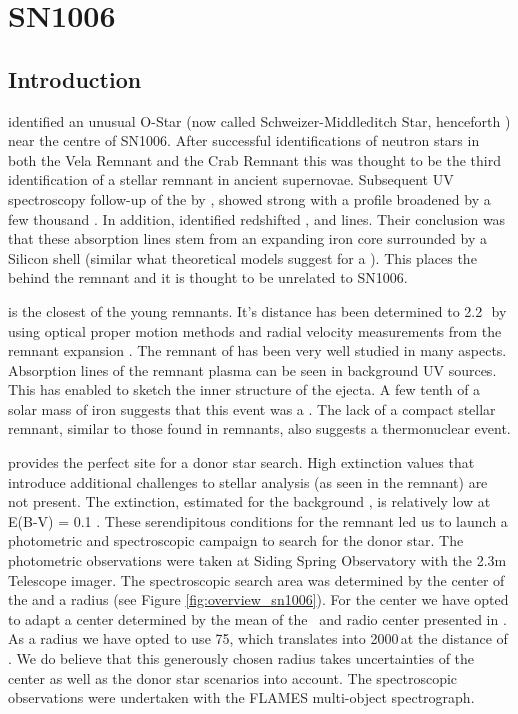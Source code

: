 \chapter{SN1006}
\label{chap:sn1006}


\section{Introduction}

\citet{1980ApJ...241.1039S} identified an unusual O-Star (now called Schweizer-Middleditch Star, henceforth \smstar) near the centre of SN1006. After successful identifications of neutron stars in both the Vela Remnant and the Crab Remnant this was thought to be the third identification of a stellar remnant in ancient supernovae. Subsequent UV spectroscopy follow-up of the \smstar by \citet{1983ApJ...269L...5W} , showed strong   with a profile broadened by a few thousand \kms. In addition, \citet{1983ApJ...269L...5W} identified redshifted ,  and  lines. Their conclusion was that these absorption lines stem from an expanding iron core surrounded by a Silicon shell (similar what theoretical models suggest for a \sneia). This places the \smstar behind the remnant and it is thought to be unrelated to SN1006. 

 is the closest of the young \snia remnants. It's distance has been determined to 2.2\,\kpc\ by using optical proper motion methods and radial velocity measurements from the remnant expansion \cite{2003ApJ...585..324W}. The remnant of  has been very well studied in many aspects. Absorption lines of the remnant plasma can be seen in background UV sources. This has enabled \citet{2005ApJ...624..189W} to sketch the inner structure of the ejecta. A few tenth of a solar mass of iron suggests that this event was a \snia. The lack of a compact stellar remnant, similar to those found in \snii remnants, also suggests a thermonuclear event. 

 provides the perfect site for a donor star search. High extinction values that introduce additional challenges to stellar analysis (as seen in the  remnant) are not present. The extinction, estimated for the background \smstar, is relatively low  at E(B-V) = 0.1 \citep{1993ApJ...416..247W,2003ApJ...585..324W}. These serendipitous conditions for the  remnant led us to launch a photometric and spectroscopic campaign to search for the donor star. The photometric observations were taken at Siding Spring Observatory with the 2.3m Telescope imager. The spectroscopic search area was determined by the center of the  and a radius (see Figure \ref{fig:overview_sn1006}). For the center we have opted to adapt a center determined by the mean of the \xray\ and radio center presented in \citet{2003ApJ...585..324W}. As a radius we have opted to use 75\arcsec, which translates into 2000\,\kms at the distance of . We do believe that this generously chosen radius takes uncertainties of the center as well as the donor star scenarios into account. The spectroscopic observations were undertaken with the FLAMES multi-object spectrograph.

